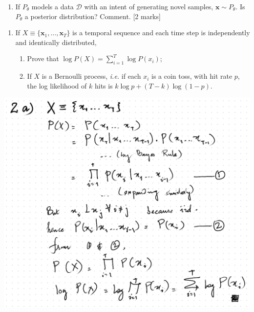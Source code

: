 \documentclass[12pt]{tiet-question-paper}
\date{Nov 2024}
\title{}
\begin{document}
\thispagestyle{empty}
\maketitle

\bvrskipline[-1.85]
\bvrhrule

\begin{enumerate}
\item If \(P_\theta\) models a data \(\mathcal{D}\) with an
intent of generating novel samples, \(\mathbf{x}\sim
   P_\theta\).  Is \(P_\theta\) a posterior distribution?
Comment. \hfill [2 marks]
\end{enumerate}

\bvrskipline[0.25]
\begin{enumerate}[resume]
\item If \(X\equiv\{\mathbf{x}_1,\ldots,\mathbf{x}_T\}\) is
a temporal sequence and each time step is
independently and identically distributed,
\begin{enumerate}
\item Prove that \(\log P(X) = \sum_{i=1}^T\log P(x_i)\);
\item If \(X\) is a Bernoulli process, \emph{i.e.} if each
\(x_{i}\) is a coin toss, with hit rate \(p\), the
log likelihood of \(k\) hits is \(k\log p +
      (T-k)\log (1-p)\).
\end{enumerate}
\end{enumerate}



\begin{center}
\includegraphics[width=.9\linewidth]{org-download-images/2024-11-12_10-15-18_screenshot.png}
\end{center}
\end{document}
